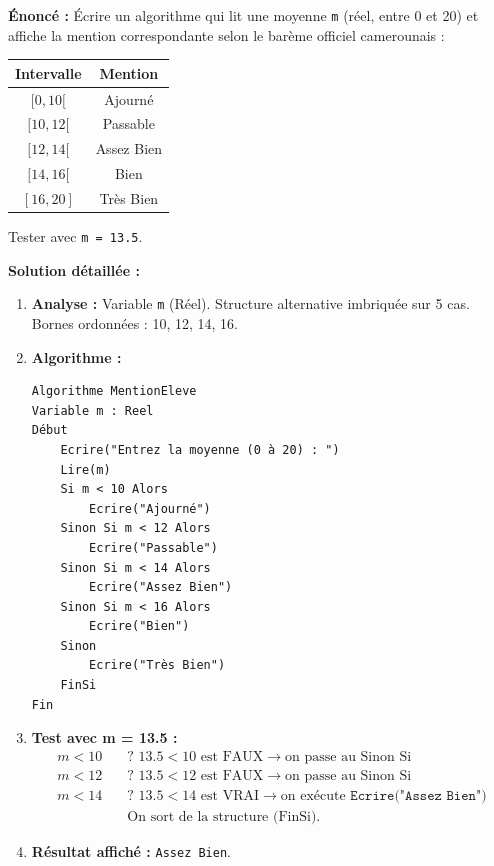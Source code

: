 \documentclass[11pt]{article}
\begin{document}
\begin{exoresolu}
\textbf{Énoncé :} Écrire un algorithme qui lit une moyenne \texttt{m} (réel, entre 0 et 20) et affiche la mention correspondante selon le barème officiel camerounais :
\begin{center}
\begin{tabular}{|c|c|}
\hline
Intervalle & Mention \\ \hline
$[0, 10[$ & Ajourné \\
$[10, 12[$ & Passable \\
$[12, 14[$ & Assez Bien \\
$[14, 16[$ & Bien \\
$[16, 20]$ & Très Bien \\ \hline
\end{tabular}
\end{center}
Tester avec \texttt{m = \num{13,5}}.

\tcblower
\textbf{Solution détaillée :}
\begin{enumerate}
    \item \textbf{Analyse :} Variable \texttt{m} (Réel). Structure alternative imbriquée sur 5 cas. Bornes ordonnées : 10, 12, 14, 16.
    \item \textbf{Algorithme :}
\begin{lstlisting}
Algorithme MentionEleve
Variable m : Reel
Début
    Ecrire("Entrez la moyenne (0 à 20) : ")
    Lire(m)
    Si m < 10 Alors
        Ecrire("Ajourné")
    Sinon Si m < 12 Alors
        Ecrire("Passable")
    Sinon Si m < 14 Alors
        Ecrire("Assez Bien")
    Sinon Si m < 16 Alors
        Ecrire("Bien")
    Sinon
        Ecrire("Très Bien")
    FinSi
Fin
\end{lstlisting}
    \item \textbf{Test avec m = \num{13,5} :}
    \begin{align*}
        m < 10 &\quad \text{? } \num{13,5} < 10 \text{ est FAUX} \rightarrow \text{on passe au Sinon Si} \\
        m < 12 &\quad \text{? } \num{13,5} < 12 \text{ est FAUX} \rightarrow \text{on passe au Sinon Si} \\
        m < 14 &\quad \text{? } \num{13,5} < 14 \text{ est VRAI} \rightarrow \text{on exécute } \texttt{Ecrire("Assez Bien")} \\
        &\quad \text{On sort de la structure (FinSi).}
    \end{align*}
    \item \textbf{Résultat affiché :} \texttt{Assez Bien}.
\end{enumerate}
\end{exoresolu}
\end{document}
